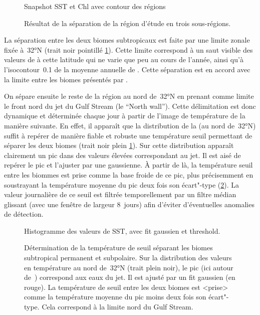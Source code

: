 \begin{figure}
  Snapshot SST et Chl avec contour des régions
  \caption[Séparation de la région d'étude en sous-régions]{
    Résultat de la séparation de la région d'étude en trois sous-régions.
  }
  \label{fig:separation-regions}
\end{figure}

La séparation entre les deux biomes subtropicaux est faite par une limite zonale fixée à~\ang{32}N (trait noir pointillé \cref{fig:separation-regions}).
Cette limite correspond à un saut visible des valeurs de  à cette latitude qui ne varie que peu au cours de l'année, ainsi qu'à l'isocontour~\qty{0.1}{\mgm} de la moyenne annuelle de .
Cette séparation est en accord avec la limite entre les biomes présentés par \textcite{sarmiento_2004}.

On sépare ensuite le reste de la région au nord de~\ang{32}N en prenant comme limite le front nord du jet du Gulf Stream (le \enquote{North wall}).
Cette délimitation est donc dynamique et déterminée chaque jour à partir de l'image de température de la manière suivante.
En effet, il apparaît que la distribution de la  (au nord de~\ang{32}N) suffit à repérer de manière fiable et robuste une température seuil permettant de séparer les deux biomes (trait noir plein \cref{fig:separation-regions}).
Sur cette distribution apparaît clairement un pic dans des valeurs élevées correspondant au jet.
Il est aisé de repérer le pic et l'ajuster par une gaussienne.
À partir de là, la température seuil entre les biommes est prise comme la base froide de ce pic,  plus précisemment en soustrayant la température moyenne du pic  deux fois son écart"-type (\cref{fig:temp-seuil-distrib}).
La valeur journalière de ce seuil est filtrée temporellement par un filtre médian glissant (avec une fenêtre de largeur 8~jours) afin d'éviter d'éventuelles anomalies de détection.

\begin{figure}
  Histogramme des valeurs de SST, avec fit gaussien et threshold.
  \caption[Délimitation des biomes subtropical permanent et subpolaire par température seuil]{
    Détermination de la température de seuil séparant les biomes subtropical permanent et subpolaire.
    Sur la distribution des valeurs en température au nord de~\ang{32}N (trait plein noir), le pic (ici autour de~) correspond aux eaux du jet. Il est ajusté par un fit gaussien (en rouge).
    La température de seuil entre les deux biomes est <prise> comme la température moyenne du pic moins deux fois son écart"-type.
    Cela correspond à la limite nord du Gulf Stream.
  }
  \label{fig:temp-seuil-distrib}
\end{figure}

